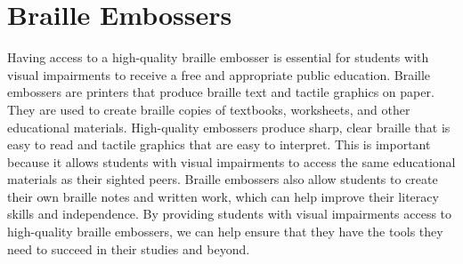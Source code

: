 \documentclass[14pt,letterpaper,twoside]{extreport}
\begin{document}
	\hypertarget{embossers}{}\section{Braille Embossers}\label{embossers}
Having access to a high-quality braille embosser is essential for students with visual impairments to receive a free and appropriate public education. Braille embossers are printers that produce braille text and tactile graphics on paper. They are used to create braille copies of textbooks, worksheets, and other educational materials. High-quality embossers produce sharp, clear braille that is easy to read and tactile graphics that are easy to interpret. This is important because it allows students with visual impairments to access the same educational materials as their sighted peers. Braille embossers also allow students to create their own braille notes and written work, which can help improve their literacy skills and independence. By providing students with visual impairments access to high-quality braille embossers, we can help ensure that they have the tools they need to succeed in their studies and beyond.
\end{document}
